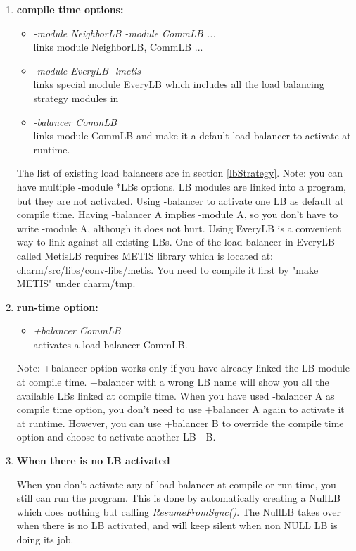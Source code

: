 \begin{enumerate}
\item {\bf compile time options:}

\begin{itemize}
\item {\em -module NeighborLB -module CommLB ...}  \\
  links module NeighborLB, CommLB ...
\item {\em -module EveryLB -lmetis} \\
  links special module EveryLB which includes all the load balancing strategy modules in \charmpp{}
\item {\em -balancer CommLB} \\
  links module CommLB and make it a default load balancer to activate at runtime.
\end{itemize}

The list of existing load balancers are in section \ref{lbStrategy}.
Note: you can have multiple -module *LBs options. LB modules are
linked into a program, but they are not activated.
Using -balancer to activate one LB as default at compile time. Having -balancer A implies -module A, so you don't have to write -module A, although it does
not hurt.
Using EveryLB is a convenient way to link against all existing LBs. 
One of the load balancer in EveryLB called MetisLB requires METIS library 
which is located at: charm/src/libs/conv-libs/metis. 
You need to compile it first by "make METIS" under charm/tmp.

\item {\bf run-time option:}

\begin{itemize}
\item {\em +balancer CommLB} \\
  activates a load balancer CommLB.
\end{itemize}

Note: +balancer option works only if you have already linked the LB module 
at compile time. +balancer with a 
wrong LB name will show you all the available LBs linked at compile time.
When you have used -balancer A as compile time option, you don't need to use 
+balancer A again to activate it at runtime. However, you can 
use +balancer B to override the compile time option and choose to
activate another LB - B.

\item {\bf When there is no LB activated}

When you don't activate any of load balancer at compile or run time, you still 
can run the program. This is done by automatically creating a NullLB which 
does nothing but calling {\em ResumeFromSync()}. 
The NullLB takes over when there is no LB activated, and will keep silent 
when non NULL LB is doing its job. 

\end{enumerate}


